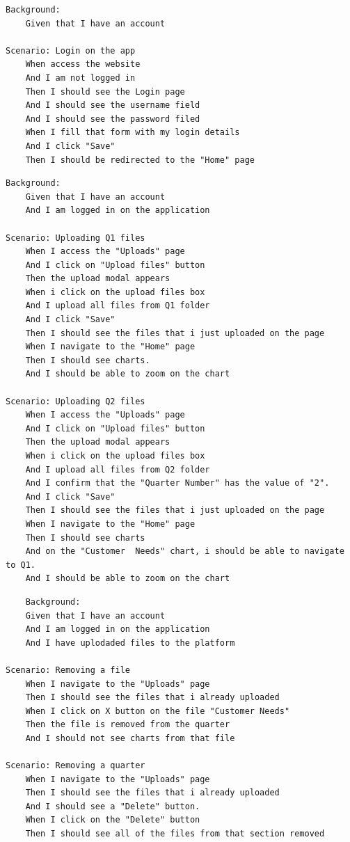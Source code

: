 \begin{verbatim}
Background:
	Given that I have an account

Scenario: Login on the app
	When access the website
	And I am not logged in
	Then I should see the Login page
	And I should see the username field
	And I should see the password filed
	When I fill that form with my login details
	And I click "Save"
	Then I should be redirected to the "Home" page
\end{verbatim}
    
\begin{verbatim}
Background:
	Given that I have an account
	And I am logged in on the application

Scenario: Uploading Q1 files
	When I access the "Uploads" page  
	And I click on "Upload files" button 
	Then the upload modal appears 
	When i click on the upload files box
	And I upload all files from Q1 folder
	And I click "Save"
	Then I should see the files that i just uploaded on the page
	When I navigate to the "Home" page
	Then I should see charts. 
	And I should be able to zoom on the chart
	
Scenario: Uploading Q2 files
	When I access the "Uploads" page  
	And I click on "Upload files" button 
	Then the upload modal appears 
	When i click on the upload files box
	And I upload all files from Q2 folder
	And I confirm that the "Quarter Number" has the value of "2".
	And I click "Save"
	Then I should see the files that i just uploaded on the page
	When I navigate to the "Home" page
	Then I should see charts
	And on the "Customer  Needs" chart, i should be able to navigate to Q1.
	And I should be able to zoom on the chart
\end{verbatim}

\begin{verbatim}
    Background:  
	Given that I have an account
	And I am logged in on the application
	And I have uplodaded files to the platform
 
Scenario: Removing a file
	When I navigate to the "Uploads" page  
	Then I should see the files that i already uploaded
	When I click on X button on the file "Customer Needs"
	Then the file is removed from the quarter
	And I should not see charts from that file
	
Scenario: Removing a quarter
	When I navigate to the "Uploads" page  
	Then I should see the files that i already uploaded
	And I should see a "Delete" button.
	When I click on the "Delete" button
	Then I should see all of the files from that section removed 
\end{verbatim}

